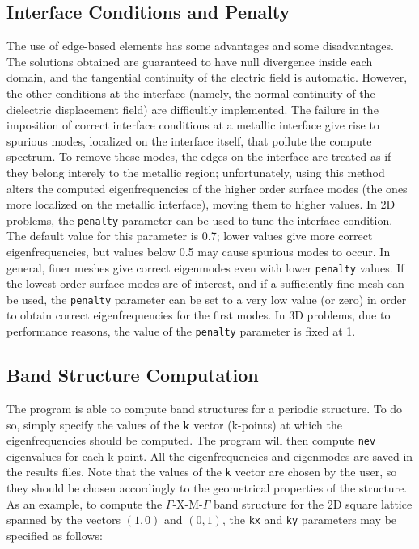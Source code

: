 \documentclass[11pt,a4paper,oneside]{article}
\begin{document}
\subsection{Interface Conditions and Penalty}
The use of edge-based elements has some advantages and some disadvantages. The solutions obtained are guaranteed to have null divergence inside each domain, and the tangential continuity of the electric field is automatic. However, the other conditions at the interface (namely, the normal continuity of the dielectric displacement field) are difficultly implemented. The failure in the imposition of correct interface conditions at a metallic interface give rise to spurious modes, localized on the interface itself, that pollute the compute spectrum. To remove these modes, the edges on the interface are treated as if they belong interely to the metallic region; unfortunately, using this method alters the computed eigenfrequencies of the higher order surface modes (the ones more localized on the metallic interface), moving them to higher values. In 2D problems, the {\tt penalty} parameter can be used to tune the interface condition. The default value for this parameter is 0.7; lower values give more correct eigenfrequencies, but values below 0.5 may cause spurious modes to occur. In general, finer meshes give correct eigenmodes even with lower {\tt penalty} values.
If the lowest order surface modes are of interest, and if a sufficiently fine mesh can be used, the {\tt penalty} parameter can be set to a very low value (or zero) in order to obtain correct eigenfrequencies for the first modes. In 3D problems, due to performance reasons, the value of the {\tt penalty} parameter is fixed at 1.

\subsection{Band Structure Computation}
The program is able to compute band structures for a periodic structure. To do so, simply specify the values of the $\boldsymbol{k}$ vector (k-points) at which the eigenfrequencies should be computed. The program will then compute {\tt nev} eigenvalues for each k-point. All the eigenfrequencies and eigenmodes are saved in the results files. Note that the values of the {\tt k} vector are chosen by the user, so they should be chosen accordingly to the geometrical properties of the structure. As an example, to compute the $\Gamma$-X-M-$\Gamma$ band structure for the 2D square lattice spanned by the vectors $(1, 0)$ and $(0, 1)$, the {\tt kx} and {\tt ky} parameters may be specified as follows:
\end{document}
